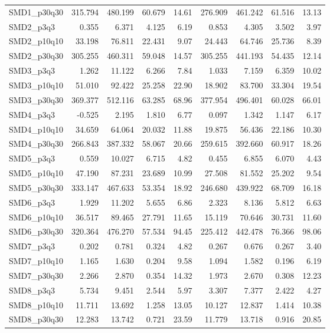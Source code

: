 \begin{longtable}{lrrrrrrrr}
SMD1\_p30q30 & 315.794 & 480.199 & 60.679 & 14.61 & 276.909 & 461.242 & 61.516 & 13.13 \\
SMD2\_p3q3 & 0.355 & 6.371 & 4.125 & 6.19 & 0.853 & 4.305 & 3.502 & 3.97 \\
SMD2\_p10q10 & 33.198 & 76.811 & 22.431 & 9.07 & 24.443 & 64.746 & 25.736 & 8.39 \\
SMD2\_p30q30 & 305.255 & 460.311 & 59.048 & 14.57 & 305.255 & 441.193 & 54.435 & 12.14 \\
SMD3\_p3q3 & 1.262 & 11.122 & 6.266 & 7.84 & 1.033 & 7.159 & 6.359 & 10.02 \\
SMD3\_p10q10 & 51.010 & 92.422 & 25.258 & 22.90 & 18.902 & 83.700 & 33.304 & 19.54 \\
SMD3\_p30q30 & 369.377 & 512.116 & 63.285 & 68.96 & 377.954 & 496.401 & 60.028 & 66.01 \\
SMD4\_p3q3 & -0.525 & 2.195 & 1.810 & 6.77 & 0.097 & 1.342 & 1.147 & 6.17 \\
SMD4\_p10q10 & 34.659 & 64.064 & 20.032 & 11.88 & 19.875 & 56.436 & 22.186 & 10.30 \\
SMD4\_p30q30 & 266.843 & 387.332 & 58.067 & 20.66 & 259.615 & 392.660 & 60.917 & 18.26 \\
SMD5\_p3q3 & 0.559 & 10.027 & 6.715 & 4.82 & 0.455 & 6.855 & 6.070 & 4.43 \\
SMD5\_p10q10 & 47.190 & 87.231 & 23.689 & 10.99 & 27.508 & 81.552 & 25.202 & 9.54 \\
SMD5\_p30q30 & 333.147 & 467.633 & 53.354 & 18.92 & 246.680 & 439.922 & 68.709 & 16.18 \\
SMD6\_p3q3 & 1.929 & 11.202 & 5.655 & 6.86 & 2.323 & 8.136 & 5.812 & 6.63 \\
SMD6\_p10q10 & 36.517 & 89.465 & 27.791 & 11.65 & 15.119 & 70.646 & 30.731 & 11.60 \\
SMD6\_p30q30 & 320.364 & 476.270 & 57.534 & 94.45 & 225.412 & 442.478 & 76.366 & 98.06 \\
SMD7\_p3q3 & 0.202 & 0.781 & 0.324 & 4.82 & 0.267 & 0.676 & 0.267 & 3.40 \\
SMD7\_p10q10 & 1.165 & 1.630 & 0.204 & 9.58 & 1.094 & 1.582 & 0.196 & 6.19 \\
SMD7\_p30q30 & 2.266 & 2.870 & 0.354 & 14.32 & 1.973 & 2.670 & 0.308 & 12.23 \\
SMD8\_p3q3 & 5.734 & 9.451 & 2.544 & 5.97 & 3.307 & 7.377 & 2.422 & 4.27 \\
SMD8\_p10q10 & 11.711 & 13.692 & 1.258 & 13.05 & 10.127 & 12.837 & 1.414 & 10.38 \\
SMD8\_p30q30 & 12.283 & 13.742 & 0.721 & 23.59 & 11.779 & 13.718 & 0.916 & 20.85 \\

\end{longtable}
